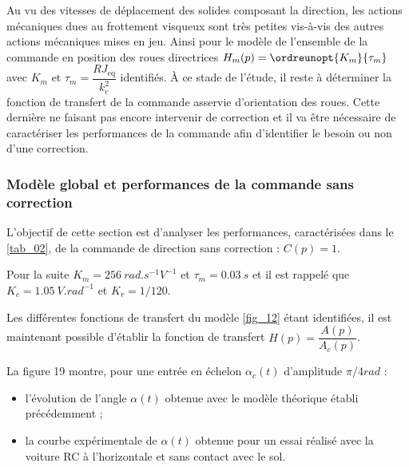 Au vu des vitesses de déplacement des solides composant la direction, les actions mécaniques dues au frottement
visqueux sont très petites vis-à-vis des autres actions mécaniques mises en jeu. Ainsi pour le modèle de l’ensemble
de la commande en position des roues directrices $H_m(p) = \ordreunopt{K_m}{\tau_m}$ avec $K_m$ et $\tau_m = \dfrac{RJ_{\text{eq}}}{k_e^2}$ identifiés.
À ce stade de l’étude, il reste à déterminer la fonction de transfert de la commande asservie d’orientation des
roues. Cette dernière ne faisant pas encore intervenir de correction et il va être nécessaire de caractériser les
performances de la commande afin d’identifier le besoin ou non d’une correction.

\subsubsection{Modèle global et performances de la commande sans correction}
\begin{obj}
L’objectif de cette section est d’analyser les performances, caractérisées dans le \autoref{tab_02}, de
la commande de direction sans correction : $C(p)=1$.
\end{obj}
Pour la suite $K_m =\SI{256}{rad.s^{-1}V^{-1}}$ et $\tau_m = \SI{0,03}{s}$ et il est rappelé que $K_c = \SI{1,05}{V.rad^{-1}}$ et $K_r = 1/120$.


Les différentes fonctions de transfert du modèle \autoref{fig_12} étant identifiées, il est maintenant possible d’établir la fonction de transfert $H(p)=\dfrac{A(p)}{A_c(p)}$.



La figure 19 montre, pour une entrée en échelon  $\alpha_c(t)$ d’amplitude $\pi/4 \si{rad}$ :
\begin{itemize}
\item l’évolution de l’angle $\alpha(t)$ obtenue avec le modèle théorique établi précédemment ;
\item la courbe expérimentale de $\alpha(t)$ obtenue pour un essai réalisé avec la voiture RC à l’horizontale et sans contact avec le sol.
\end{itemize}

